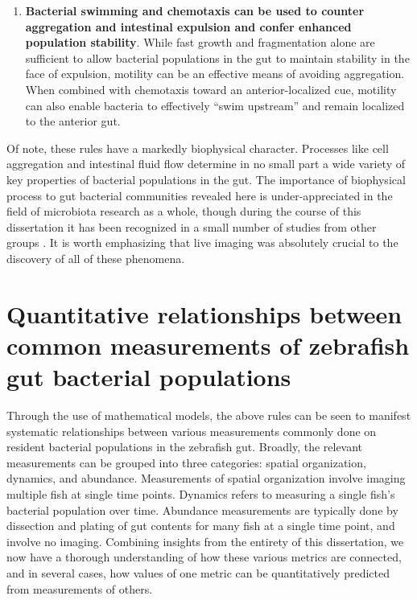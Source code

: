 \begin{enumerate}
\item 
\textbf{Bacterial swimming and chemotaxis can be used to counter aggregation and intestinal expulsion and confer enhanced population stability}. While fast growth and fragmentation alone are sufficient to allow bacterial populations in the gut to maintain stability in the face of expulsion, motility can be an effective means of avoiding aggregation. When combined with chemotaxis toward an anterior-localized cue, motility can also enable bacteria to effectively ``swim upstream'' and remain localized to the anterior gut.

\end{enumerate}
Of note, these rules have a markedly biophysical character. Processes like cell aggregation and intestinal fluid flow determine in no small part a wide variety of key properties of bacterial populations in the gut. The importance of biophysical process to gut bacterial communities revealed here is under-appreciated in the field of microbiota research as a whole, though during the course of this dissertation it has been recognized in a small number of studies from other groups \cite{cremer_effect_2016,moor_high-avidity_2017,tropini2018transient}. It is worth emphasizing that live imaging was absolutely crucial to the discovery of all of these phenomena.

\section{Quantitative relationships between common measurements of zebrafish gut bacterial populations}

Through the use of mathematical models, the above rules can be seen to manifest systematic relationships between various measurements commonly done on resident bacterial populations in the zebrafish gut. Broadly, the relevant measurements can be grouped into three categories: spatial organization, dynamics, and abundance. Measurements of spatial organization involve imaging multiple fish at single time points. Dynamics refers to measuring a single fish's bacterial population over time. Abundance measurements are typically done by dissection and plating of gut contents for many fish at a single time point, and involve no imaging. Combining insights from the entirety of this dissertation, we now have a thorough understanding of how these various metrics are connected, and in several cases, how values of one metric can be quantitatively predicted from measurements of others.

